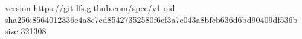 version https://git-lfs.github.com/spec/v1
oid sha256:8564012336e4a8c7ed85427352580f6cf3a7e043a8bfcb636d6bd90409df536b
size 321308
